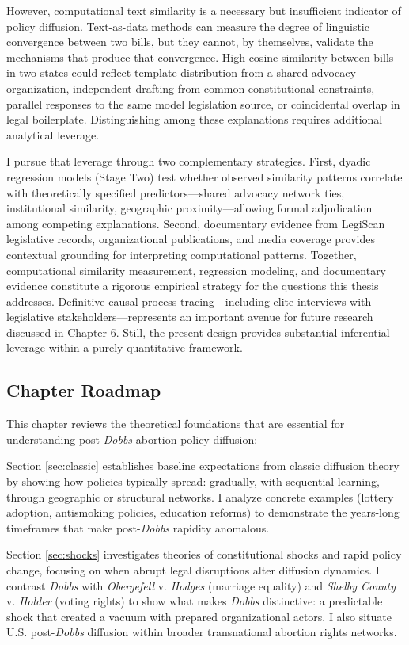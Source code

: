 However, computational text similarity is a necessary but insufficient indicator of policy diffusion. Text-as-data methods can measure the degree of linguistic convergence between two bills, but they cannot, by themselves, validate the mechanisms that produce that convergence. High cosine similarity between bills in two states could reflect template distribution from a shared advocacy organization, independent drafting from common constitutional constraints, parallel responses to the same model legislation source, or coincidental overlap in legal boilerplate. Distinguishing among these explanations requires additional analytical leverage.

I pursue that leverage through two complementary strategies. First, dyadic regression models (Stage Two) test whether observed similarity patterns correlate with theoretically specified predictors---shared advocacy network ties, institutional similarity, geographic proximity---allowing formal adjudication among competing explanations. Second, documentary evidence from LegiScan legislative records, organizational publications, and media coverage provides contextual grounding for interpreting computational patterns. Together, computational similarity measurement, regression modeling, and documentary evidence constitute a rigorous empirical strategy for the questions this thesis addresses. Definitive causal process tracing---including elite interviews with legislative stakeholders---represents an important avenue for future research discussed in Chapter 6. Still, the present design provides substantial inferential leverage within a purely quantitative framework.

\subsection{Chapter Roadmap}

This chapter reviews the theoretical foundations that are essential for understanding post-\emph{Dobbs} abortion policy diffusion:

Section \ref{sec:classic} establishes baseline expectations from classic diffusion theory by showing how policies typically spread: gradually, with sequential learning, through geographic or structural networks. I analyze concrete examples (lottery adoption, antismoking policies, education reforms) to demonstrate the years-long timeframes that make post-\textit{Dobbs} rapidity anomalous.

Section \ref{sec:shocks} investigates theories of constitutional shocks and rapid policy change, focusing on when abrupt legal disruptions alter diffusion dynamics. I contrast \textit{Dobbs} with \textit{Obergefell} v. \textit{Hodges} (marriage equality) and \textit{Shelby County} v. \textit{Holder} (voting rights) to show what makes \textit{Dobbs} distinctive: a predictable shock that created a vacuum with prepared organizational actors. I also situate U.S. post-\textit{Dobbs} diffusion within broader transnational abortion rights networks.


